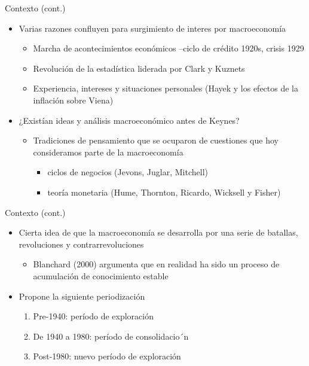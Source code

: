 \documentclass[
  ignorenonframetext,
]{beamer}
\providecommand{\tightlist}{%
  \setlength{\itemsep}{0pt}\setlength{\parskip}{0pt}}\usepackage{longtable,booktabs,array}
\begin{document}
\begin{frame}{Contexto (cont.)}
\protect\hypertarget{contexto-cont.-1}{}
\begin{itemize}
\tightlist
\item
  Varias razones confluyen para surgimiento de interes por macroeconomía

  \begin{itemize}
  \tightlist
  \item
    Marcha de acontecimientos económicos --ciclo de crédito 1920s,
    crisis 1929
  \item
    Revolución de la estadística liderada por Clark y Kuznets
  \item
    Experiencia, intereses y situaciones personales (Hayek y los efectos
    de la inflación sobre Viena)
  \end{itemize}
\item
  ¿Existían ideas y análisis macroeconómico antes de Keynes?

  \begin{itemize}
  \tightlist
  \item
    Tradiciones de pensamiento que se ocuparon de cuestiones que hoy
    consideramos parte de la macroeconomía

    \begin{itemize}
    \tightlist
    \item
      ciclos de negocios (Jevons, Juglar, Mitchell)
    \item
      teoría monetaria (Hume, Thornton, Ricardo, Wicksell y Fisher)
    \end{itemize}
  \end{itemize}
\end{itemize}
\end{frame}

\begin{frame}{Contexto (cont.)}
\protect\hypertarget{contexto-cont.-2}{}
\begin{itemize}
\tightlist
\item
  Cierta idea de que la macroeconomía se desarrolla por una serie de
  batallas, revoluciones y contrarrevoluciones

  \begin{itemize}
  \tightlist
  \item
    Blanchard (2000) argumenta que en realidad ha sido un proceso de
    acumulación de conocimiento estable
  \end{itemize}
\item
  Propone la siguiente periodización

  \begin{enumerate}
  \tightlist
  \item
    Pre-1940: período de exploración
  \item
    De 1940 a 1980: período de consolidacio´n
  \item
    Post-1980: nuevo período de exploración
  \end{enumerate}
\end{itemize}
\end{frame}
\end{document}
